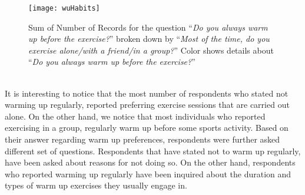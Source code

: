 \begin{figure}[h]
    \centering
    \texttt{[image: wuHabits]}
    \caption{Sum of Number of Records for the question ``\textit{Do you always warm up before the exercise?}'' broken down by ``\textit{Most of the time, do you exercise alone/with a friend/in a group?}'' Color shows details about ``\textit{Do you always warm up before the exercise?}''}
    \label{fig:wuHabits}
\end{figure}\\
It is interesting to notice that the most number of respondents who stated not warming up regularly, reported preferring exercise sessions that are carried out alone. On the other hand, we notice that most individuals who reported exercising in a group, regularly warm up before some sports activity. Based on their answer regarding warm up preferences, respondents were further asked different set of questions. Respondents that have stated not to warm up regularly, have been asked about reasons for not doing so. On the other hand, respondents who reported warming up regularly have been inquired about the duration and types of warm up exercises they usually engage in.
